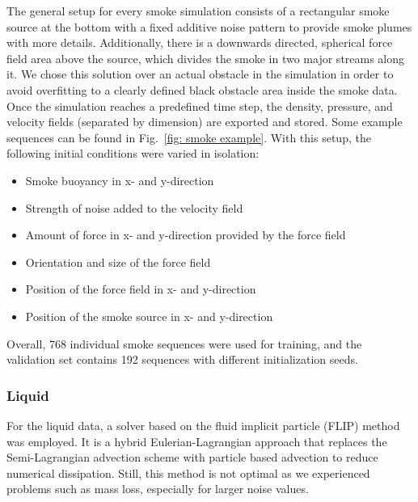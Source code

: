 The general setup for every smoke simulation consists of a rectangular smoke source at the bottom with a fixed additive noise pattern to provide smoke plumes with more details. Additionally, there is a downwards directed, spherical force field area above the source, which divides the smoke in two major streams along it. We chose this solution over an actual obstacle in the simulation in order to avoid overfitting to a clearly defined black obstacle area inside the smoke data. Once the simulation reaches a predefined time step, the density, pressure, and velocity fields (separated by dimension) are exported and stored. Some example sequences can be found in Fig.~\ref{fig: smoke example}. With this setup, the following initial conditions were varied in isolation:
\vspace{-0.2cm}
\begin{itemize}
    \setlength\itemsep{0em}
    \item Smoke buoyancy in x- and y-direction
    \item Strength of noise added to the velocity field
    \item Amount of force in x- and y-direction provided by the force field
    \item Orientation and size of the force field
    \item Position of the force field in x- and y-direction
    \item Position of the smoke source in x- and y-direction
\end{itemize}

Overall, 768 individual smoke sequences were used for training, and the validation set contains 192 sequences with different initialization seeds.

\subsubsection*{Liquid}
For the liquid data, a solver based on the fluid implicit particle (FLIP) method \cite{zhu2005} was employed. It is a hybrid Eulerian-Lagrangian approach that replaces the Semi-Lagrangian advection scheme with particle based advection to reduce numerical dissipation. Still, this method is not optimal as we experienced problems such as mass loss, especially for larger noise values.

